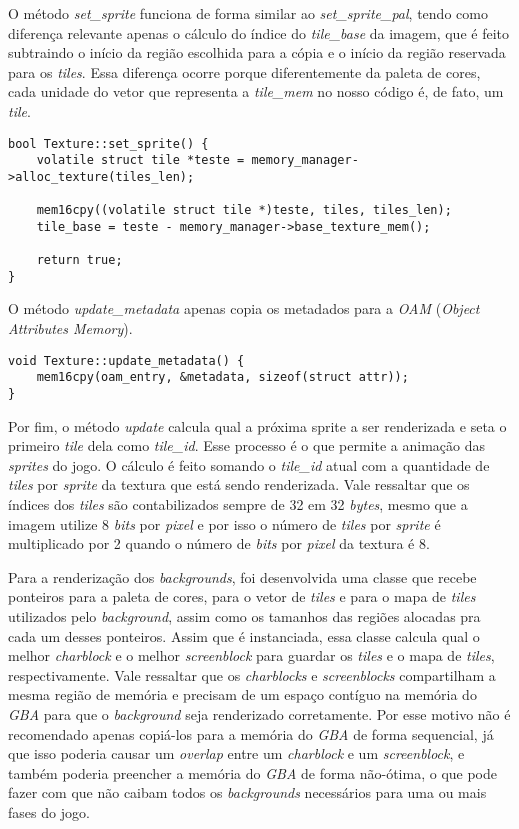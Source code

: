 O método \textit{set\_sprite} funciona de forma similar ao \textit{set\_sprite\_pal}, tendo como diferença relevante apenas o cálculo do índice do \textit{tile\_base} da imagem, que é feito subtraindo o início da região escolhida para a cópia e o início da região reservada para os \textit{tiles}. Essa diferença ocorre porque diferentemente da paleta de cores, cada unidade do vetor que representa a \textit{tile\_mem} no nosso código é, de fato, um \textit{tile}.

\begin{lstlisting}[float,caption={Função de alocação das \textit{sprites} de uma textura.}]
bool Texture::set_sprite() {
    volatile struct tile *teste = memory_manager->alloc_texture(tiles_len);

    mem16cpy((volatile struct tile *)teste, tiles, tiles_len);
    tile_base = teste - memory_manager->base_texture_mem();

    return true;
}
\end{lstlisting}

O método \textit{update\_metadata} apenas copia os metadados para a \textit{OAM} (\textit{Object Attributes Memory}).

\begin{lstlisting}[float,caption={Função de cópia dos metadados das texturas.}]
void Texture::update_metadata() {
    mem16cpy(oam_entry, &metadata, sizeof(struct attr));
}
\end{lstlisting}

Por fim, o método \textit{update} calcula qual a próxima sprite a ser renderizada e seta o primeiro \textit{tile} dela como \textit{tile\_id}. Esse processo é o que permite a animação das \textit{sprites} do jogo. O cálculo é feito somando o \textit{tile\_id} atual com a quantidade de \textit{tiles} por \textit{sprite} da textura que está sendo renderizada. Vale ressaltar que os índices dos \textit{tiles} são contabilizados sempre de 32 em 32 \textit{bytes}, mesmo que a imagem utilize 8 \textit{bits} por \textit{pixel} e por isso o número de \textit{tiles} por \textit{sprite} é multiplicado por 2 quando o número de \textit{bits} por \textit{pixel} da textura é 8.

Para a renderização dos \textit{backgrounds}, foi desenvolvida uma classe que recebe ponteiros para a paleta de cores,  para o vetor de \textit{tiles} e para o mapa de \textit{tiles} utilizados pelo \textit{background}, assim como os tamanhos das regiões alocadas pra cada um desses ponteiros. Assim que é instanciada, essa classe calcula qual o melhor \textit{charblock} e o melhor \textit{screenblock} para guardar os \textit{tiles} e o mapa de \textit{tiles}, respectivamente. Vale ressaltar que os \textit{charblocks} e \textit{screenblocks} compartilham a mesma região de memória e precisam de um espaço contíguo na memória do \textit{GBA} para que o \textit{background} seja renderizado corretamente. Por esse motivo não é recomendado apenas copiá-los para a memória do \textit{GBA} de forma sequencial, já que isso poderia causar um \textit{overlap} entre um \textit{charblock} e um \textit{screenblock}, e também poderia preencher a memória do \textit{GBA} de forma não-ótima, o que pode fazer com que não caibam todos os \textit{backgrounds} necessários para uma ou mais fases do jogo.